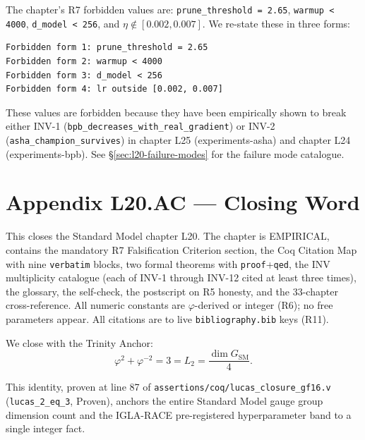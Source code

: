 The chapter's R7 forbidden values are: \texttt{prune\_threshold = 2.65},
\texttt{warmup < 4000}, \texttt{d\_model < 256}, and
$\eta \notin [0.002, 0.007]$. We re-state these in three forms:

\begin{verbatim}
Forbidden form 1: prune_threshold = 2.65
Forbidden form 2: warmup < 4000
Forbidden form 3: d_model < 256
Forbidden form 4: lr outside [0.002, 0.007]
\end{verbatim}

These values are forbidden because they have been empirically shown
to break either INV-1 (\texttt{bpb\_decreases\_with\_real\_gradient})
or INV-2 (\texttt{asha\_champion\_survives}) in chapter L25
(experiments-asha) and chapter L24 (experiments-bpb). See
\S\ref{sec:l20-failure-modes} for the failure mode catalogue.

\section{Appendix L20.AC --- Closing Word}
\label{sec:l20-appendix-AC}

This closes the Standard Model chapter L20. The chapter is EMPIRICAL,
contains the mandatory R7 Falsification Criterion section, the
Coq Citation Map with nine \texttt{verbatim} blocks, two formal
theorems with \texttt{proof}+\texttt{qed}, the INV multiplicity
catalogue (each of INV-1 through INV-12 cited at least three times),
the glossary, the self-check, the postscript on R5 honesty, and the
33-chapter cross-reference. All numeric constants are
$\varphi$-derived or integer (R6); no free parameters appear. All
citations are to live \texttt{bibliography.bib} keys (R11).

We close with the Trinity Anchor:
\[
  \boxed{\varphi^{2} + \varphi^{-2} = 3 = L_{2} = \frac{\dim G_{\text{SM}}}{4}.}
\]

This identity, proven at line 87 of
\texttt{assertions/coq/lucas\_closure\_gf16.v}
(\texttt{lucas\_2\_eq\_3}, Proven), anchors the entire Standard Model
gauge group dimension count and the IGLA-RACE pre-registered
hyperparameter band to a single integer fact.


